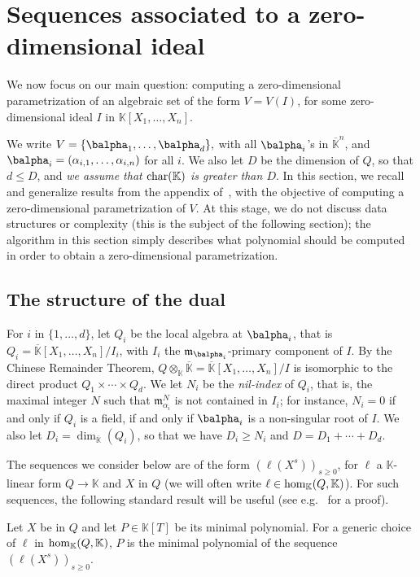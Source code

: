 \documentclass[12pt]{article}
\newcommand{\lf}{X}
\def\K{\mathbb{K}}
\def\K {\ensuremath{\mathbb{K}}}
\def\Kbar {{\ensuremath{\overline{\mathbb{K}}}}}
\def\D {\ensuremath{D}}
\def\m {\ensuremath{\mathfrak{m}}}
\begin{document}
\section{Sequences associated to a zero-dimensional ideal}

We now focus on our main question: computing a zero-dimensional
parametrization of an algebraic set of the form $V=V(I)$, for some
zero-dimensional ideal $I$ in $\K[X_1,\dots,X_n]$. 

We write $V=\{\balpha_1,\dots,\balpha_d\},$ with all $\balpha_i$'s in
$\Kbar^n$, and $\balpha_i=(\alpha_{i,1},\dots,\alpha_{i,n})$ for all
$i$.  We also let $\D$ be the dimension of $Q$, so that $d \le \D$,
and {\em we assume that ${\rm char}(\K)$ is greater than $D$}. In this
section, we recall and generalize results from the appendix
of~\cite{BoSaSc03}, with the objective of computing a zero-dimensional
parametrization of $V$. At this stage, we do not discuss data
structures or complexity (this is the subject of the following
section); the algorithm in this section simply describes what 
polynomial should be computed in order to obtain a zero-dimensional
parametrization.



\subsection{The structure of the dual}  

For $i$ in $\{1,\dots,d\}$, let $Q_i$ be the local algebra at
$\balpha_i$, that is $Q_i=\Kbar[X_1,\dots,X_n]/I_i$, with $I_i$ the
$\m_{\balpha_i}$-primary component of $I$. By the Chinese Remainder
Theorem, $Q\otimes_\K \Kbar=\Kbar[X_1,\dots,X_n]/I$ is isomorphic to
the direct product $Q_1\times \cdots \times Q_d$.  We let $N_i$ be the
{\em nil-index} of $Q_i$, that is, the maximal integer $N$ such that
$\m_{\alpha_i}^N$ is not contained in $I_i$; for instance, $N_i=0$ if
and only if $Q_i$ is a field, if and only if $\balpha_i$ is a
non-singular root of $I$. We also let
$\D_i=\dim_\Kbar(Q_i)$, so that we have $D_i \ge N_i$ and $\D=\D_1 + \cdots + \D_d$.

The sequences we consider below are of the form $(\ell(\lf^s))_{s \ge
  0}$, for $\ell$ a $\K$-linear form $Q \to \K$ and $\lf$ in $Q$
(we will often write $\ell \in {\rm hom}_\K(Q,\K)$). For
such sequences, the following standard result will be useful
(see e.g.~\cite[Proposition~1 \& 2]{BoSaSc03} for a proof).
\begin{lemma}\label{lemma:minpoly}
  Let $\lf$ be in $Q$ and let $P \in \K[T]$ be its minimal
  polynomial. For a generic choice of $\ell$ in ${\rm hom}_\K(Q,\K)$,
  $P$ is the minimal polynomial of the sequence $(\ell(\lf^s))_{s \ge
    0}$.
\end{lemma}
\end{document}
